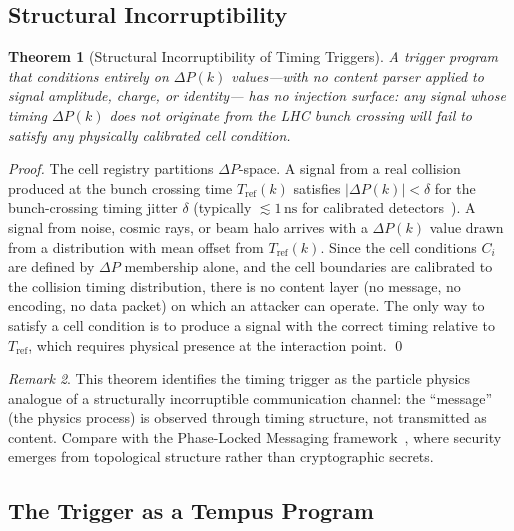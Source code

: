 \documentclass[twocolumn,10pt,a4paper]{article}
\theoremstyle{thmstyle}
\newtheorem{theorem}{Theorem}[section]
\theoremstyle{definition}
\theoremstyle{remark}
\newtheorem{remark}[theorem]{Remark}
\newcommand{\dP}{\Delta P}
\begin{document}
\subsection{Structural Incorruptibility}

\begin{theorem}[Structural Incorruptibility of Timing Triggers]
\label{thm:incorruptibility}
A trigger program that conditions entirely on $\dP(k)$ values---with
no content parser applied to signal amplitude, charge, or identity---
has no injection surface: any signal whose timing $\dP(k)$ does not
originate from the LHC bunch crossing will fail to satisfy any
physically calibrated cell condition.
\end{theorem}

\begin{proof}
The cell registry partitions $\dP$-space. A signal from a real
collision produced at the bunch crossing time $T_{\mathrm{ref}}(k)$
satisfies $|\dP(k)| < \delta$ for the bunch-crossing timing jitter
$\delta$ (typically $\lesssim 1\,\mathrm{ns}$ for calibrated
detectors~\citep{atlas_trigger_run2}). A signal from noise, cosmic
rays, or beam halo arrives with a $\dP(k)$ value drawn from a
distribution with mean offset from $T_{\mathrm{ref}}(k)$. Since the
cell conditions $C_i$ are defined by $\dP$ membership alone, and the
cell boundaries are calibrated to the collision timing distribution,
there is no content layer (no message, no encoding, no data packet)
on which an attacker can operate. The only way to satisfy a cell
condition is to produce a signal with the correct timing relative to
$T_{\mathrm{ref}}$, which requires physical presence at the
interaction point. \qed
\end{proof}

\begin{remark}
This theorem identifies the timing trigger as the particle physics
analogue of a structurally incorruptible communication channel: the
``message'' (the physics process) is observed through timing
structure, not transmitted as content. Compare with the Phase-Locked
Messaging framework~\citep{landauer1961irreversibility}, where
security emerges from topological structure rather than cryptographic
secrets.
\end{remark}

\subsection{The Trigger as a Tempus Program}
\end{document}
